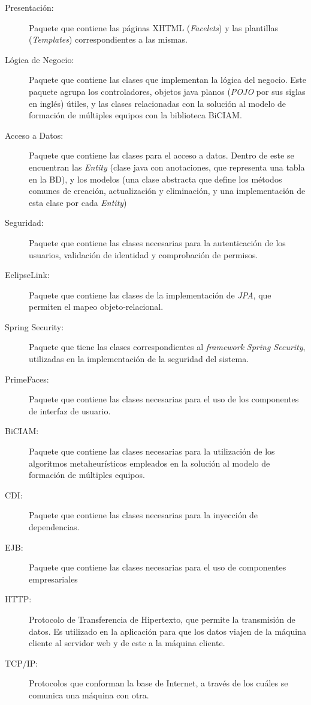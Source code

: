 \begin{description}
	\item[Presentación:] Paquete que contiene las páginas XHTML (\textit{Facelets}) y las plantillas (\textit{Templates}) correspondientes a las mismas.
	\item[Lógica de Negocio:] Paquete que contiene las clases que implementan la lógica del negocio. Este paquete agrupa los controladores, objetos java planos (\textit{POJO} por sus siglas en inglés) útiles, y las clases relacionadas con la solución al modelo de formación de múltiples equipos con la biblioteca BiCIAM. 
	\item[Acceso a Datos:] Paquete que contiene las clases para el acceso a datos. Dentro de este se encuentran las \textit{Entity} (clase java con anotaciones, que representa una tabla en la BD), y los modelos (una clase abstracta que define los métodos comunes de creación, actualización y eliminación, y una implementación de esta clase por cada \textit{Entity}) 
	\item[Seguridad:] Paquete que contiene las clases necesarias para la autenticación de los usuarios, validación de identidad y comprobación de permisos. 
	\item[EclipseLink:] Paquete que contiene las clases de la implementación de \textit{JPA}, que permiten el mapeo objeto-relacional. 
	\item[Spring Security:] Paquete que tiene las clases correspondientes al \textit{framework} \textit{Spring Security}, utilizadas en la implementación de la seguridad del sistema. 
	\item[PrimeFaces:] Paquete que contiene las clases necesarias para el uso de los componentes de interfaz de usuario. 
	\item[BiCIAM:] Paquete que contiene las clases necesarias para la utilización de los algoritmos metaheurísticos empleados en la solución al modelo de formación de múltiples equipos. 
	\item[CDI:] Paquete que contiene las clases necesarias para la inyección de dependencias. 
	\item[EJB:] Paquete que contiene las clases necesarias para el uso de componentes empresariales
	\item[HTTP:] Protocolo de Transferencia de Hipertexto, que permite la transmisión de datos. Es utilizado en la aplicación para que los datos viajen de la máquina cliente al servidor web y de este a la máquina cliente. 
	\item[TCP/IP:] Protocolos que conforman la base de Internet, a través de los cuáles se comunica una máquina con otra. 	
\end{description}

